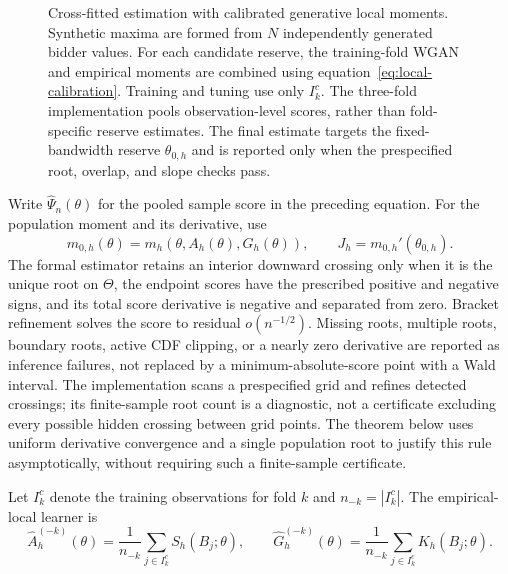\begin{figure}[tbp]
\caption{Cross-fitted estimation with calibrated generative local moments.
Synthetic maxima are formed from $N$ independently generated bidder values.
For each candidate reserve, the training-fold WGAN and empirical moments are
combined using equation~\eqref{eq:local-calibration}. Training and tuning use
only $I_k^c$. The three-fold implementation pools observation-level
scores, rather than fold-specific reserve estimates. The final estimate targets
the fixed-bandwidth reserve $\theta_{0,h}$ and is reported only when the
prespecified root, overlap, and slope checks pass.}
\label{fig:estimation-workflow}
\end{figure}

Write $\widehat\Psi_n(\theta)$ for the pooled sample score in the preceding
equation. For the population moment and its derivative, use
\[
m_{0,h}(\theta)=m_h(\theta,A_h(\theta),G_h(\theta)),
\qquad J_h=m_{0,h}'(\theta_{0,h}).
\]
The formal estimator retains an interior downward
crossing only when it is the unique root on $\Theta$, the endpoint scores have
the prescribed positive and negative signs, and its total score derivative
is negative and separated from zero. Bracket refinement solves the score to
residual $o(n^{-1/2})$. Missing roots, multiple roots, boundary roots, active
CDF clipping, or a nearly zero derivative are reported as inference failures,
not replaced by a minimum-absolute-score point with a Wald interval.
The implementation scans a prespecified grid and refines detected crossings;
its finite-sample root count is a diagnostic, not a certificate excluding
every possible hidden crossing between grid points. The theorem below uses
uniform derivative convergence and a single population root to justify this
rule asymptotically, without requiring such a finite-sample certificate.

Let $I_k^c$ denote the training observations for fold $k$ and
$n_{-k}=|I_k^c|$. The empirical-local learner is
\begin{equation}
\widehat A_h^{(-k)}(\theta)
=\frac{1}{n_{-k}}\sum_{j\in I_k^c}S_h(B_j;\theta),
\qquad
\widehat G_h^{(-k)}(\theta)
=\frac{1}{n_{-k}}\sum_{j\in I_k^c}K_h(B_j;\theta).
\label{eq:empirical-local-nuisance}
\end{equation}

